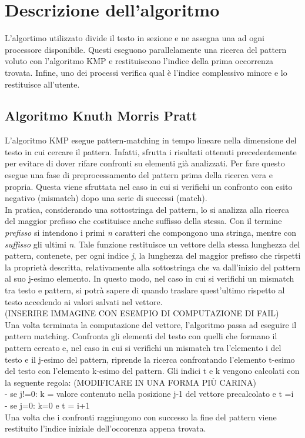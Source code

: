 \chapter{Descrizione dell'algoritmo}
L'algortimo utilizzato divide il testo in sezione e ne assegna una ad ogni processore disponibile. Questi eseguono parallelamente una ricerca del pattern voluto con l'algoritmo KMP e restituiscono l'indice della prima occorrenza trovata. Infine, uno dei processi verifica qual è l'indice complessivo minore e lo restituisce all'utente.
\section{Algoritmo Knuth Morris Pratt}
L'algoritmo KMP esegue pattern-matching in tempo lineare nella dimensione del testo in cui cercare il pattern. Infatti, sfrutta i risultati ottenuti precedentemente per evitare di dover rifare confronti su elementi già analizzati. Per fare questo esegue una fase di preprocessamento del pattern prima della ricerca vera e propria. Questa viene sfruttata nel caso in cui si verifichi un confronto con esito negativo (mismatch) dopo una serie di successi (match).\\
In pratica, considerando una sottostringa del pattern, lo si analizza alla ricerca del maggior prefisso che costituisce anche suffisso della stessa. Con il termine {\itshape prefisso} si intendono i primi {\itshape n} caratteri che compongono una stringa, mentre con {\itshape suffisso} gli ultimi {\itshape n}. Tale funzione restituisce un vettore della stessa lunghezza del pattern, contenete, per ogni indice {\itshape j}, la lunghezza del maggior prefisso che rispetti la proprietà descritta, relativamente alla sottostringa che va dall'inizio del pattern al suo j-esimo elemento. In questo modo, nel caso in cui si verifichi un mismatch tra testo e pattern, si potrà sapere di quando traslare quest'ultimo rispetto al testo accedendo ai valori salvati nel vettore.\\

(INSERIRE IMMAGINE CON ESEMPIO DI COMPUTAZIONE DI FAIL)\\

Una volta terminata la computazione del vettore, l'algoritmo passa ad eseguire il pattern matching. Confronta gli elementi del testo con quelli che formano il pattern cercato e, nel caso in cui si verifichi un mismatch tra l'elemento i del testo e il j-esimo del pattern, riprende la ricerca confrontando l'elemento t-esimo del testo con l'elemento k-esimo del pattern. Gli indici t e k  vengono calcolati con la seguente regola: (MODIFICARE IN UNA FORMA PIÙ CARINA)\\
- se j!=0: k = valore contenuto nella posizione j-1 del vettore precalcolato e t =i\\
- se j=0: k=0 e t = i+1\\
Una volta che i confronti raggiungono con successo la fine del pattern viene restituito l'indice iniziale dell'occorenza appena trovata.\\ \\
 
